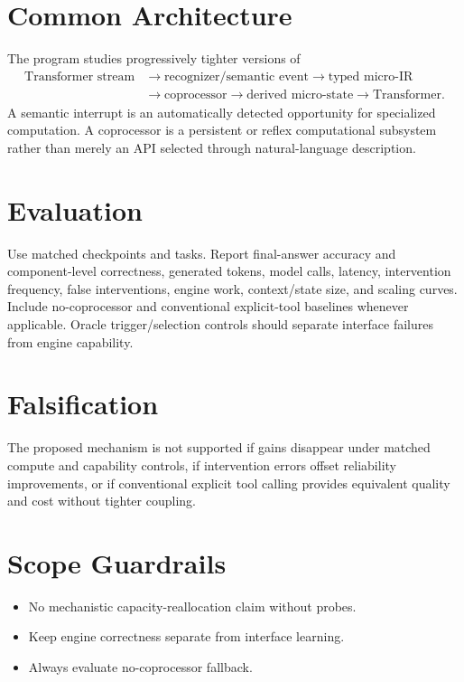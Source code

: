 \documentclass[11pt]{article}
\begin{document}
\section{Common Architecture}
The program studies progressively tighter versions of
\[
\begin{aligned}
\text{Transformer stream}
&\rightarrow \text{recognizer/semantic event}
\rightarrow \text{typed micro-IR} \\
&\rightarrow \text{coprocessor}
\rightarrow \text{derived micro-state}
\rightarrow \text{Transformer}.
\end{aligned}
\]
A semantic interrupt is an automatically detected opportunity for specialized computation. A coprocessor is a persistent or reflex computational subsystem rather than merely an API selected through natural-language description.

\section{Evaluation}
Use matched checkpoints and tasks. Report final-answer accuracy and component-level correctness, generated tokens, model calls, latency, intervention frequency, false interventions, engine work, context/state size, and scaling curves. Include no-coprocessor and conventional explicit-tool baselines whenever applicable. Oracle trigger/selection controls should separate interface failures from engine capability.

\section{Falsification}
The proposed mechanism is not supported if gains disappear under matched compute and capability controls, if intervention errors offset reliability improvements, or if conventional explicit tool calling provides equivalent quality and cost without tighter coupling.

\section{Scope Guardrails}
\begin{itemize}
\item No mechanistic capacity-reallocation claim without probes.
\item Keep engine correctness separate from interface learning.
\item Always evaluate no-coprocessor fallback.
\end{itemize}
\end{document}
